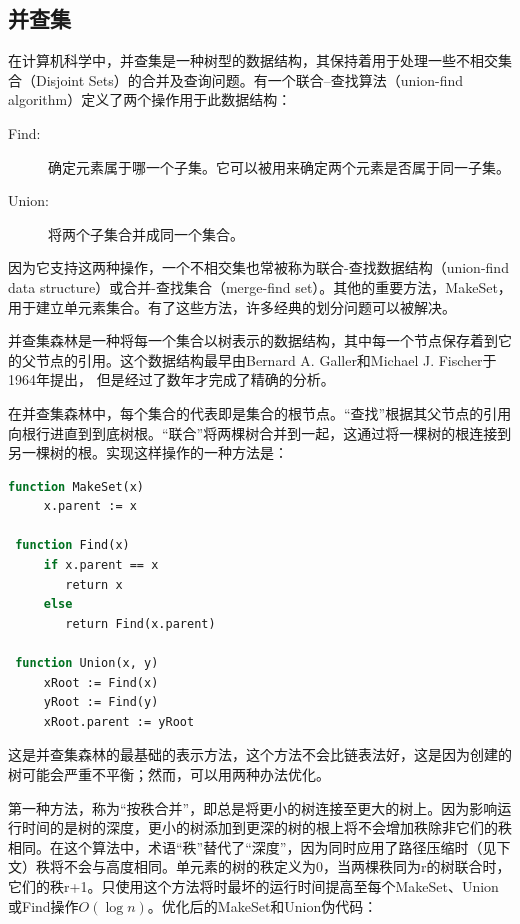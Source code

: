 \documentclass[a4paper]{article}
\begin{document}
\begin{CJK}{UTF8}{gbsn}
\subsection{并查集}

在计算机科学中，并查集是一种树型的数据结构，其保持着用于处理一些不相交集合（Disjoint Sets）的合并及查询问题。有一个联合--查找算法（union-find algorithm）定义了两个操作用于此数据结构：



\begin{description}
  \item[Find:] 确定元素属于哪一个子集。它可以被用来确定两个元素是否属于同一子集。
  \item[Union:] 将两个子集合并成同一个集合。
\end{description}

因为它支持这两种操作，一个不相交集也常被称为联合-查找数据结构（union-find data structure）或合并-查找集合（merge-find set）。其他的重要方法，MakeSet，用于建立单元素集合。有了这些方法，许多经典的划分问题可以被解决。

并查集森林是一种将每一个集合以树表示的数据结构，其中每一个节点保存着到它的父节点的引用。这个数据结构最早由Bernard A. Galler和Michael J. Fischer于1964年提出，\cite{Galler} 但是经过了数年才完成了精确的分析。

在并查集森林中，每个集合的代表即是集合的根节点。“查找”根据其父节点的引用向根行进直到到底树根。“联合”将两棵树合并到一起，这通过将一棵树的根连接到另一棵树的根。实现这样操作的一种方法是：


\begin{lstlisting}[language=pascal]
 function MakeSet(x)
     x.parent := x

 function Find(x)
     if x.parent == x
        return x
     else
        return Find(x.parent)

 function Union(x, y)
     xRoot := Find(x)
     yRoot := Find(y)
     xRoot.parent := yRoot
\end{lstlisting}

这是并查集森林的最基础的表示方法，这个方法不会比链表法好，这是因为创建的树可能会严重不平衡；然而，可以用两种办法优化。

第一种方法，称为“按秩合并”，即总是将更小的树连接至更大的树上。因为影响运行时间的是树的深度，更小的树添加到更深的树的根上将不会增加秩除非它们的秩相同。在这个算法中，术语“秩”替代了“深度”，因为同时应用了路径压缩时（见下文）秩将不会与高度相同。单元素的树的秩定义为0，当两棵秩同为r的树联合时，它们的秩r+1。只使用这个方法将时最坏的运行时间提高至每个MakeSet、Union或Find操作$O(\log n)$。优化后的MakeSet和Union伪代码：


\end{CJK}
\end{document}

